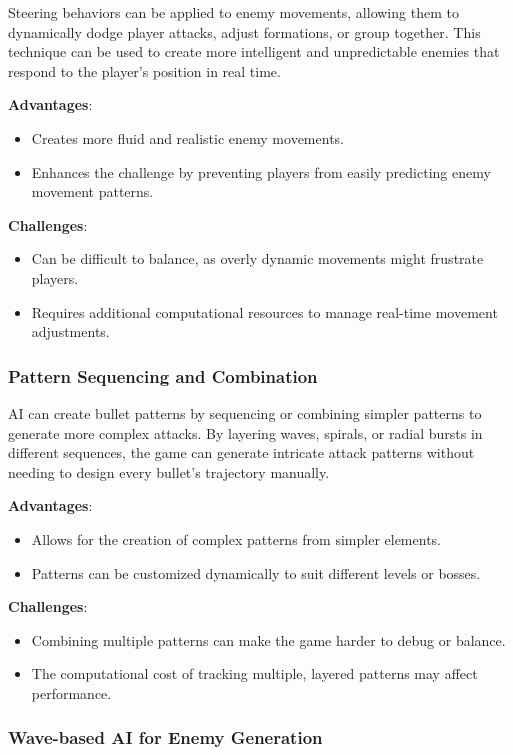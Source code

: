 Steering behaviors can be applied to enemy movements, allowing them to dynamically dodge player attacks, adjust formations, or group together. This technique can be used to create more intelligent and unpredictable enemies that respond to the player's position in real time.

\textbf{Advantages}:
\begin{itemize}
    \item Creates more fluid and realistic enemy movements.
    \item Enhances the challenge by preventing players from easily predicting enemy movement patterns.
\end{itemize}

\textbf{Challenges}:
\begin{itemize}
    \item Can be difficult to balance, as overly dynamic movements might frustrate players.
    \item Requires additional computational resources to manage real-time movement adjustments.
\end{itemize}

\subsubsection{Pattern Sequencing and Combination}

AI can create bullet patterns by sequencing or combining simpler patterns to generate more complex attacks. By layering waves, spirals, or radial bursts in different sequences, the game can generate intricate attack patterns without needing to design every bullet’s trajectory manually.

\textbf{Advantages}:
\begin{itemize}
    \item Allows for the creation of complex patterns from simpler elements.
    \item Patterns can be customized dynamically to suit different levels or bosses.
\end{itemize}

\textbf{Challenges}:
\begin{itemize}
    \item Combining multiple patterns can make the game harder to debug or balance.
    \item The computational cost of tracking multiple, layered patterns may affect performance.
\end{itemize}

\subsubsection{Wave-based AI for Enemy Generation}

